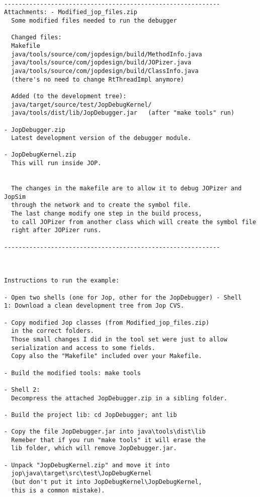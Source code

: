 \begin{verbatim}

------------------------------------------------------------
Attachments: - Modified_jop_files.zip
  Some modified files needed to run the debugger

  Changed files:
  Makefile
  java/tools/source/com/jopdesign/build/MethodInfo.java
  java/tools/source/com/jopdesign/build/JOPizer.java
  java/tools/source/com/jopdesign/build/ClassInfo.java
  (there's no need to change RtThreadImpl anymore)

  Added (to the development tree):
  java/target/source/test/JopDebugKernel/
  java/tools/dist/lib/JopDebugger.jar   (after "make tools" run)

- JopDebugger.zip
  Latest development version of the debugger module.

- JopDebugKernel.zip
  This will run inside JOP.


  The changes in the makefile are to allow it to debug JOPizer and JopSim
  through the network and to create the symbol file.
  The last change modify one step in the build process,
  to call JOPizer from another class which will create the symbol file
  right after JOPizer runs.

------------------------------------------------------------



Instructions to run the example:

- Open two shells (one for Jop, other for the JopDebugger) - Shell
1: Download a clean development tree from Jop CVS.

- Copy modified Jop classes (from Modified_jop_files.zip)
  in the correct folders.
  Those small changes I did in the tool set were just to allow
  serialization and access to some fields.
  Copy also the "Makefile" included over your Makefile.

- Build the modified tools: make tools

- Shell 2:
  Decompress the attached JopDebugger.zip in a sibling folder.

- Build the project lib: cd JopDebugger; ant lib

- Copy the file JopDebugger.jar into java\tools\dist\lib
  Remeber that if you run "make tools" it will erase the
  lib folder, which will remove JopDebugger.jar.

- Unpack "JopDebugKernel.zip" and move it into
  jop\java\target\src\test\JopDebugKernel
  (but don't put it into JopDebugKernel\JopDebugKernel,
  this is a common mistake).


\end{verbatim}

